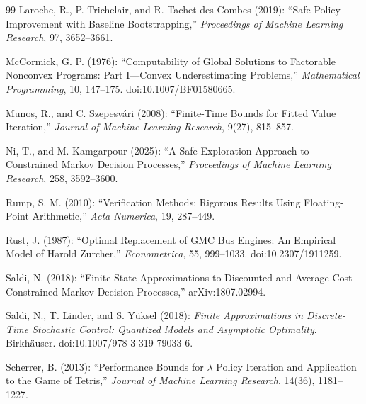 \begin{thebibliography}{99}
Laroche, R., P. Trichelair, and R. Tachet des Combes (2019): ``Safe Policy Improvement with Baseline Bootstrapping,'' \emph{Proceedings of Machine Learning Research}, 97, 3652--3661.

McCormick, G. P. (1976): ``Computability of Global Solutions to Factorable Nonconvex Programs: Part I---Convex Underestimating Problems,'' \emph{Mathematical Programming}, 10, 147--175. doi:10.1007/BF01580665.

Munos, R., and C. Szepesv\'ari (2008): ``Finite-Time Bounds for Fitted Value Iteration,'' \emph{Journal of Machine Learning Research}, 9(27), 815--857.

Ni, T., and M. Kamgarpour (2025): ``A Safe Exploration Approach to Constrained Markov Decision Processes,'' \emph{Proceedings of Machine Learning Research}, 258, 3592--3600.

Rump, S. M. (2010): ``Verification Methods: Rigorous Results Using Floating-Point Arithmetic,'' \emph{Acta Numerica}, 19, 287--449.

Rust, J. (1987): ``Optimal Replacement of GMC Bus Engines: An Empirical Model of Harold Zurcher,'' \emph{Econometrica}, 55, 999--1033. doi:10.2307/1911259.

Saldi, N. (2018): ``Finite-State Approximations to Discounted and Average Cost Constrained Markov Decision Processes,'' arXiv:1807.02994.

Saldi, N., T. Linder, and S. Y\"uksel (2018): \emph{Finite Approximations in Discrete-Time Stochastic Control: Quantized Models and Asymptotic Optimality}. Birkh\"auser. doi:10.1007/978-3-319-79033-6.

Scherrer, B. (2013): ``Performance Bounds for $\lambda$ Policy Iteration and Application to the Game of Tetris,'' \emph{Journal of Machine Learning Research}, 14(36), 1181--1227.

\end{thebibliography}
